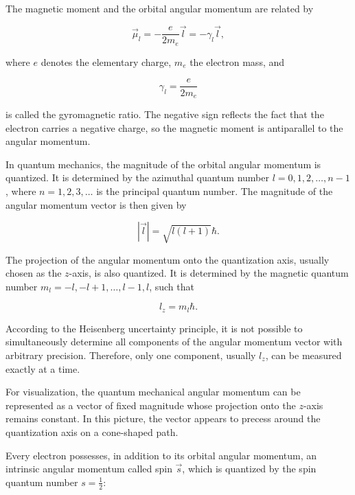 \documentclass{article}
\begin{document}
The magnetic moment and the orbital angular momentum are related by

\begin{equation}
    \vec{\mu}_l = -\frac{e}{2m_e}\vec{l} = -\gamma_l \vec{l},
    \label{angular_magnetic_moment}
\end{equation}

where $e$ denotes the elementary charge, $m_e$ the electron mass, and

\begin{equation}
    \gamma_l = \frac{e}{2m_e}
\end{equation}

is called the gyromagnetic ratio. The negative sign reflects the fact that the electron carries a negative charge, so the magnetic moment is antiparallel to the angular momentum.

In quantum mechanics, the magnitude of the orbital angular momentum is quantized. It is determined by the azimuthal quantum number $l = 0, 1, 2, \dots, n-1$, where $n = 1, 2, 3, \dots$ is the principal quantum number. The magnitude of the angular momentum vector is then given by

\begin{equation}
    |\vec{l}| = \sqrt{l(l+1)}\hbar.
\end{equation}

The projection of the angular momentum onto the quantization axis, usually chosen as the $z$-axis, is also quantized. It is determined by the magnetic quantum number $m_l = -l, -l+1, \dots, l-1, l$, such that

\begin{equation}
    l_z = m_l \hbar.
\end{equation}

According to the Heisenberg uncertainty principle, it is not possible to simultaneously determine all components of the angular momentum vector with arbitrary precision. Therefore, only one component, usually $l_z$, can be measured exactly at a time.

For visualization, the quantum mechanical angular momentum can be represented as a vector of fixed magnitude whose projection onto the $z$-axis remains constant. In this picture, the vector appears to precess around the quantization axis on a cone-shaped path.

Every electron possesses, in addition to its orbital angular momentum, an intrinsic angular momentum called spin $\vec{s}$, which is quantized by the spin quantum number $s = \frac{1}{2}$:
\end{document}
